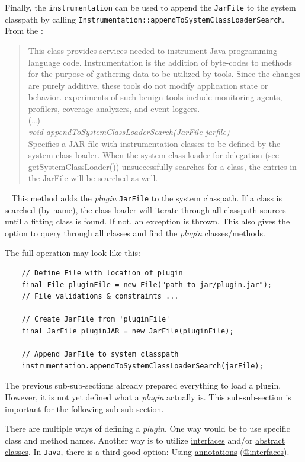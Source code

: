 Finally, the \lstinline{instrumentation} can be used to append the \lstinline{JarFile} to the system classpath by calling \lstinline{Instrumentation::appendToSystemClassLoaderSearch}.
From the \textcite{javadoc:instrumentation}:
\begin{quote}
    This class provides services needed to instrument Java programming language code. Instrumentation is the addition of byte-codes to methods for the purpose of gathering data to be utilized by tools. Since the changes are purely additive, these tools do not modify application state or behavior. experiments of such benign tools include monitoring agents, profilers, coverage analyzers, and event loggers.
    \\
    (\dots)
    \\
    \textit{void appendToSystemClassLoaderSearch(JarFile jarfile)}\\
    Specifies a JAR file with instrumentation classes to be defined by the system class loader. When the system class loader for delegation (see getSystemClassLoader()) unsuccessfully searches for a class, the entries in the JarFile will be searched as well.
\end{quote}~\parencite{javadoc:instrumentation}
This method adds the \textit{plugin} \lstinline{JarFile} to the system classpath.
If a class is searched (by name), the class-loader will iterate through all classpath sources until a fitting class is found.
If not, an exception is thrown.
This also gives the option to query through all classes and find the \textit{plugin} classes/methods.

The full operation may look like this:
\begin{lstlisting}
    // Define File with location of plugin
    final File pluginFile = new File("path-to-jar/plugin.jar");
    // File validations & constraints ...

    // Create JarFile from 'pluginFile'
    final JarFile pluginJAR = new JarFile(pluginFile);

    // Append JarFile to system classpath
    instrumentation.appendToSystemClassLoaderSearch(jarFile);
\end{lstlisting}

The previous sub-sub-sections already prepared everything to load a plugin.
However, it is not yet defined what a \textit{plugin} actually is.
This sub-sub-section is important for the following sub-sub-section.

There are multiple ways of defining a \textit{plugin}.
One way would be to use specific class and method names.
Another way is to utilize \underline{interfaces} and/or \underline{abstract classes}.
In \texttt{Java}, there is a third good option: 
Using \underline{annotations} (\underline{@interfaces}).

